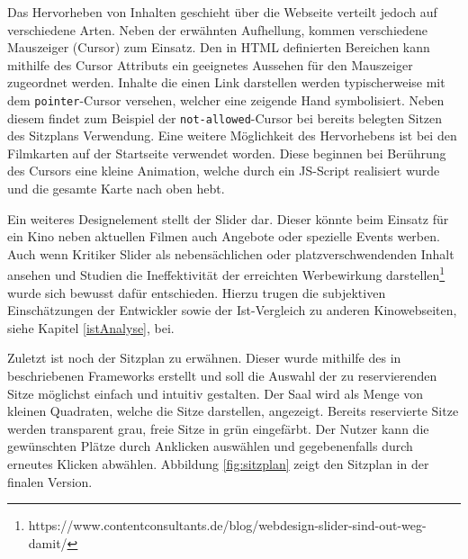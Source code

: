 	
	Das Hervorheben von Inhalten geschieht über die Webseite verteilt jedoch auf verschiedene Arten. Neben der erwähnten Aufhellung, kommen verschiedene Mauszeiger (Cursor) zum Einsatz. Den in HTML definierten Bereichen kann mithilfe des Cursor Attributs ein geeignetes Aussehen für den Mauszeiger zugeordnet werden. Inhalte die einen Link darstellen werden typischerweise mit dem \texttt{pointer}-Cursor versehen, welcher eine zeigende Hand symbolisiert. Neben diesem findet zum Beispiel der \texttt{not-allowed}-Cursor bei bereits belegten Sitzen des Sitzplans Verwendung. Eine weitere Möglichkeit des Hervorhebens ist bei den Filmkarten auf der Startseite verwendet worden. Diese beginnen bei Berührung des Cursors eine kleine Animation, welche durch ein JS-Script realisiert wurde und die gesamte Karte nach oben hebt. 
	
	Ein weiteres Designelement stellt der Slider dar. Dieser könnte beim Einsatz für ein Kino neben aktuellen Filmen auch Angebote oder spezielle Events werben. Auch wenn Kritiker Slider als nebensächlichen oder platzverschwendenden Inhalt ansehen und Studien die Ineffektivität der erreichten Werbewirkung darstellen\footnote{https://www.contentconsultants.de/blog/webdesign-slider-sind-out-weg-damit/} wurde sich bewusst dafür entschieden. Hierzu trugen die subjektiven Einschätzungen der Entwickler sowie der Ist-Vergleich zu anderen Kinowebseiten, siehe Kapitel \vref{istAnalyse}, bei.
	
	Zuletzt ist noch der Sitzplan zu erwähnen. Dieser wurde mithilfe des in %
	beschriebenen Frameworks erstellt und soll die Auswahl der zu reservierenden Sitze möglichst einfach und intuitiv gestalten. Der Saal wird als Menge von kleinen Quadraten, welche die Sitze darstellen, angezeigt. Bereits reservierte Sitze werden transparent grau, freie Sitze in grün eingefärbt. Der Nutzer kann die gewünschten Plätze durch Anklicken auswählen und gegebenenfalls durch erneutes Klicken abwählen. Abbildung \vref{fig:sitzplan} zeigt den Sitzplan in der finalen Version.
	

